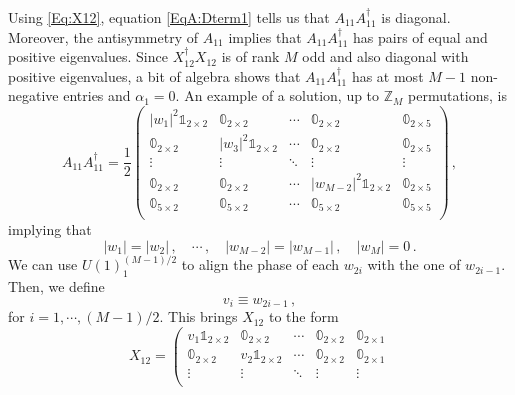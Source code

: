 \documentclass[a4paper,12pt]{article}
\begin{document}
{Using \eqref{Eq:X12}, equation \eqref{EqA:Dterm1} tells us that $A_{11} A_{11}^\dagger$ is diagonal. Moreover, the antisymmetry of $A_{11}$ implies that $A_{11} A_{11}^\dagger$ has pairs of equal and positive eigenvalues. Since $X^\dagger_{12} X_{12}$ is of rank $M$ odd and also diagonal with positive eigenvalues, a bit of algebra shows that $A_{11} A_{11}^\dagger$ has at most $M-1$ non-negative entries and $\alpha_1=0$. An example of a solution, up to $\mathbb{Z}_{M}$ permutations, is
	\begin{equation}
		A_{11}A_{11}^\dagger = \frac{1}{2} \left(\begin{array}{cccc|c}
			\vert w_1 \vert^2 \mathbb{1}_{2\times2} & \mathbb{0}_{2\times2} & \cdots & \mathbb{0}_{2\times2} & \mathbb{0}_{2\times5} \\
			\mathbb{0}_{2\times2} &  \vert w_3\vert^2 \mathbb{1}_{2\times2} & \cdots & \mathbb{0}_{2\times2} & \mathbb{0}_{2\times5} \\
			\vdots & \vdots  & \ddots & \vdots  & \vdots  \\
			\mathbb{0}_{2\times2} & \mathbb{0}_{2\times2} & \cdots &  \vert w_{M-2}\vert^2 \mathbb{1}_{2\times2} & \mathbb{0}_{2\times5} \\ \hline
			\mathbb{0}_{5\times2} & \mathbb{0}_{5\times2} & \cdots &  \mathbb{0}_{5\times2} & \mathbb{0}_{5\times5} \\
		\end{array} \right)\, , \label{Eq:AAdag}
	\end{equation}
	implying that
	\begin{equation}
		\vert w_1 \vert = \vert w_2 \vert  \, , \quad \cdots \, , \quad \vert w_{M-2} \vert = \vert w_{M-1} \vert \, , \quad \vert w_M \vert = 0 \, .
	\end{equation}
We can use $U(1)^{(M-1)/2}_1$ to align the phase of each $w_{2i}$ with the one of $w_{2i-1}$. Then, we define
\begin{equation}
	v_i \equiv w_{2i-1} \, ,
\end{equation}
for $i=1, \cdots, (M-1)/2$. This brings $X_{12}$ to the form
\begin{equation}
X_{12} = \left(\begin{array}{cccc|c}
	v_1 \mathbb{1}_{2\times2}  & \mathbb{0}_{2\times2} & \cdots & \mathbb{0}_{2\times2} & \mathbb{0}_{2\times1} \\
	\mathbb{0}_{2\times2} & v_2 \mathbb{1}_{2\times2}  & \cdots & \mathbb{0}_{2\times2} & \mathbb{0}_{2\times1} \\
	\vdots & \vdots  & \ddots & \vdots & \vdots \\

\end{array}
\end{equation}}
\end{document}
